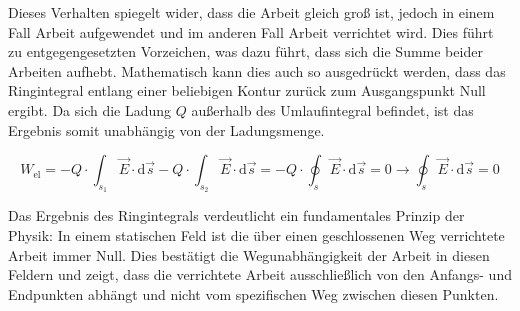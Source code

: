 \begin{frame}
{		%
		
		
		Dieses Verhalten spiegelt wider, dass die Arbeit gleich groß ist, jedoch in einem Fall Arbeit aufgewendet und im anderen Fall Arbeit verrichtet wird.
		Dies führt zu entgegengesetzten Vorzeichen, was dazu führt, dass sich die Summe beider Arbeiten aufhebt.
		Mathematisch kann dies auch so ausgedrückt werden, dass das Ringintegral entlang einer beliebigen Kontur zurück zum Ausgangspunkt Null ergibt.
		Da sich die Ladung $Q$ außerhalb des Umlaufintegral befindet, ist das Ergebnis somit unabhängig von der Ladungsmenge.
		
	\begin{equation}
	W_\mathrm{el} = - Q \cdot \int_{s_\mathrm{1}} \vec{E} \cdot \mathrm{d}\vec{s} -Q \cdot \int_{s_\mathrm{2}}\vec{E} \cdot \mathrm{d}\vec{s} = - Q \cdot \oint_{s}\vec{E} \cdot \mathrm{d}\vec{s} = 0
	\rightarrow \oint_{s}\vec{E} \cdot \mathrm{d}\vec{s} = 0
	\end{equation}


		Das Ergebnis des Ringintegrals verdeutlicht ein fundamentales Prinzip der Physik: In einem statischen Feld ist die über einen geschlossenen Weg
		verrichtete Arbeit immer Null. Dies bestätigt die Wegunabhängigkeit der Arbeit in diesen Feldern und zeigt, dass die verrichtete Arbeit ausschließlich
		von den Anfangs- und Endpunkten abhängt und nicht vom spezifischen Weg zwischen diesen Punkten. 
		  


}
\end{frame}
